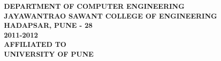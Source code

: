 \begin{center}
\vspace{1cm}
\large{\textbf{DEPARTMENT OF COMPUTER ENGINEERING}}\\
\Large{\textbf{JAYAWANTRAO SAWANT COLLEGE OF ENGINEERING}}\\
\large{\textbf{HADAPSAR, PUNE - 28}}
\large{\textbf{\\2011-2012}}\\[0.5cm]
\vspace{1cm}
\Large{\textbf{AFFILIATED TO\\}}
\LARGE{\textbf{UNIVERSITY OF PUNE}}
\newpage

\end{center}


